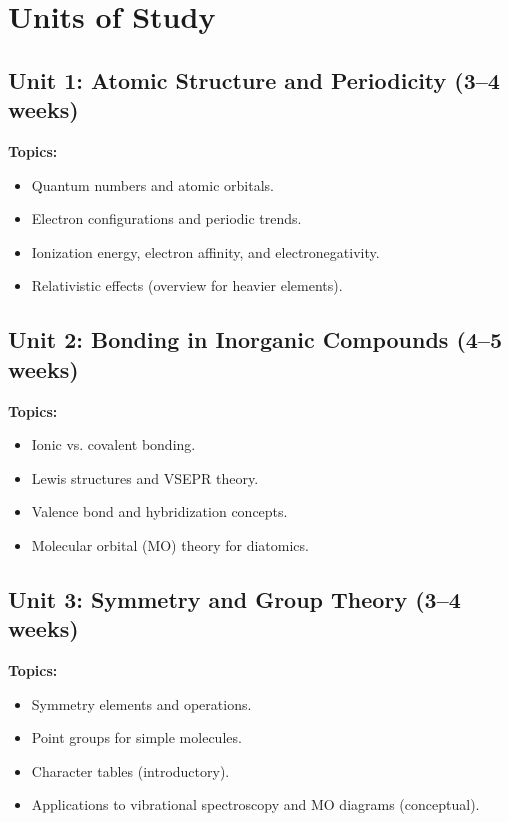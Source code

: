 \documentclass[12pt,oneside]{book}
\begin{document}
\section{Units of Study}

\subsection{Unit 1: Atomic Structure and Periodicity (3--4 weeks)}

\textbf{Topics:}
\begin{itemize}
    \item Quantum numbers and atomic orbitals.
    \item Electron configurations and periodic trends.
    \item Ionization energy, electron affinity, and electronegativity.
    \item Relativistic effects (overview for heavier elements).
\end{itemize}

\subsection{Unit 2: Bonding in Inorganic Compounds (4--5 weeks)}

\textbf{Topics:}
\begin{itemize}
    \item Ionic vs. covalent bonding.
    \item Lewis structures and VSEPR theory.
    \item Valence bond and hybridization concepts.
    \item Molecular orbital (MO) theory for diatomics.
\end{itemize}

\subsection{Unit 3: Symmetry and Group Theory (3--4 weeks)}

\textbf{Topics:}
\begin{itemize}
    \item Symmetry elements and operations.
    \item Point groups for simple molecules.
    \item Character tables (introductory).
    \item Applications to vibrational spectroscopy and MO diagrams (conceptual).
\end{itemize}
\end{document}
